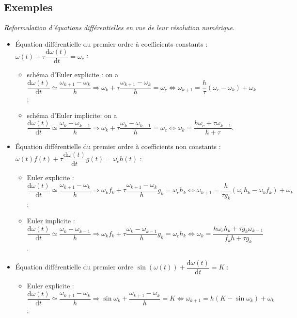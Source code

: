 \documentclass[10pt,fleqn]{article} %
\begin{document}
\subsection*{Exemples}
\textit{Reformulation d'équations différentielles en vue de leur résolution numérique.}
\begin{itemize}[label=,font=\color{ocre}] 
\item Équation différentielle du premier ordre à coefficients constants : $\omega(t) + \tau \dfrac{\text{d} \omega(t)}{\text{d}t} = \omega_c $ :
\begin{itemize}
\item schéma d'Euler explicite : on a $\dfrac{\text{d} \omega(t)}{\text{d}t}\simeq \dfrac{\omega_{k+1}-\omega_k}{h} \Rightarrow  \omega_k + \tau  \dfrac{\omega_{k+1}-\omega_k}{h} = \omega_c  \Leftrightarrow \omega_{k+1} =\dfrac{h}{\tau} \left(\omega_c - \omega_k\right)+\omega_k$;
\item schéma d'Euler implicite: on a $\dfrac{\text{d} \omega(t)}{\text{d}t}\simeq \dfrac{\omega_{k}-\omega_{k-1}}{h} \Rightarrow  \omega_k + \tau  \dfrac{\omega_{k}-\omega_{k-1}}{h} = \omega_c  \Leftrightarrow   \omega_k = \dfrac{h\omega_c + \tau\omega_{k-1}}{h+\tau} $.
\end{itemize}
\item Équation différentielle du premier ordre à coefficients non constants :  $\omega(t) f(t) + \tau \dfrac{\text{d} \omega(t)}{\text{d}t} g(t)  = \omega_c h(t)$ :
\begin{itemize}
\item Euler explicite : $\dfrac{\text{d} \omega(t)}{\text{d}t}\simeq \dfrac{\omega_{k+1}-\omega_k}{h} \Rightarrow  \omega_k f_k+ \tau  \dfrac{\omega_{k+1}-\omega_k}{h} g_k= \omega_c h_k  \Leftrightarrow \omega_{k+1} =\dfrac{h}{\tau g_k} \left(\omega_c h_k - \omega_k f_k \right)+\omega_k$;
\item Euler implicite : $\dfrac{\text{d} \omega(t)}{\text{d}t}\simeq \dfrac{\omega_{k}-\omega_{k-1}}{h} \Rightarrow  \omega_k f_k+ \tau \dfrac{\omega_{k}-\omega_{k-1}}{h} g_k= \omega_c h_k  \Leftrightarrow \omega_k =  \dfrac{h\omega_c h_k +\tau g_k\omega_{k-1}}{f_k h+   \tau g_k}  $.
\end{itemize}
\item Équation différentielle du premier ordre  $\sin \left(\omega(t)\right) + \dfrac{\text{d}\omega(t)}{\text{d}t}=K$ :
\begin{itemize}
\item Euler explicite : $\dfrac{\text{d} \omega(t)}{\text{d}t}\simeq \dfrac{\omega_{k+1}-\omega_k}{h} \Rightarrow  \sin \omega_k +  \dfrac{\omega_{k+1}-\omega_k}{h}=K \Leftrightarrow  \omega_{k+1}=h\left( K - \sin \omega_k\right)+\omega_k$;

\end{itemize}
\end{itemize}
\end{document}
